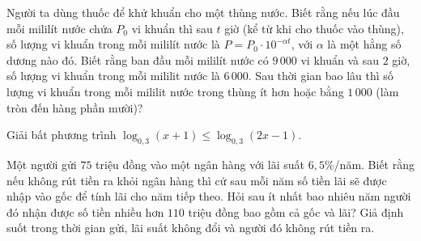 \begin{ex}%
	Người ta dùng thuốc để khử khuẩn cho một thùng nước. Biết rằng nếu lúc đầu mỗi mililít nước chứa $P_{0}$ vi khuẩn thì sau $t$ giờ (kể từ khi cho thuốc vào thùng), số lượng vi khuẩn trong mỗi mililít nước là $P=P_0 \cdot 10^{-\alpha t}$, với $\alpha$ là một hằng số dương nào đó. Biết rằng ban đầu mỗi mililít nước có $9\,000$ vi khuẩn và sau $2$ giờ, số lượng vi khuẩn trong mỗi mililit nước là $6\,000$. Sau thời gian bao lâu thì số lượng vi khuẩn trong mỗi mililit nước trong thùng ít hơn hoặc bằng $1\,000$ (làm tròn đến hàng phần mười)?
\end{ex}

\begin{ex}%
	Giải bất phương trình $\log_{0{,}3}{(x+1)}\leq\log_{0{,}3}{(2x-1)}$.
\end{ex}

\begin{ex}%
	Một người gửi $75$ triệu đồng vào một ngân hàng với lãi suất $6{,}5$\%/năm. Biết rằng nếu không rút tiền ra khỏi ngân hàng thì cứ sau mỗi năm số tiền lãi sẽ được nhập vào gốc để tính lãi cho năm tiếp theo. Hỏi sau ít nhất bao nhiêu năm người đó nhận được số tiền nhiều hơn $110$ triệu đồng bao gồm cả gốc và lãi? Giả định suốt trong thời gian gửi, lãi suất không đổi và người đó không rút tiền ra.
	
\end{ex}

